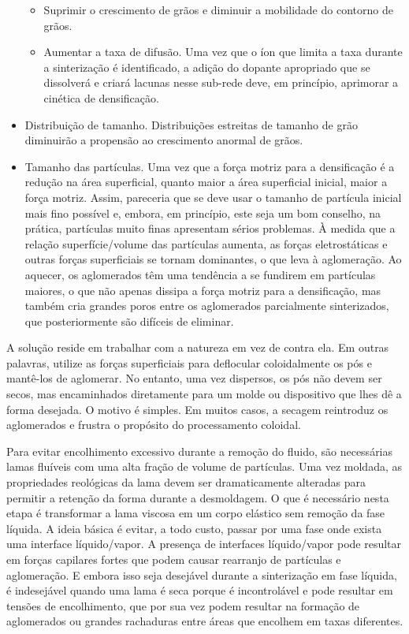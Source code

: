 \begin{itemize}
\begin{itemize}
        \item Suprimir o crescimento de grãos e diminuir a mobilidade do contorno de grãos.
        \item Aumentar a taxa de difusão. Uma vez que o íon que limita a taxa durante a sinterização é identificado, a adição do dopante apropriado que se dissolverá e criará lacunas nesse sub-rede deve, em princípio, aprimorar a cinética de densificação.
    \end{itemize}
    \item Distribuição de tamanho. Distribuições estreitas de tamanho de grão diminuirão a propensão ao crescimento anormal de grãos.
    \item Tamanho das partículas. Uma vez que a força motriz para a densificação é a redução na área superficial, quanto maior a área superficial inicial, maior a força motriz. Assim, pareceria que se deve usar o tamanho de partícula inicial mais fino possível e, embora, em princípio, este seja um bom conselho, na prática, partículas muito finas apresentam sérios problemas. À medida que a relação superfície/volume das partículas aumenta, as forças eletrostáticas e outras forças superficiais se tornam dominantes, o que leva à aglomeração. Ao aquecer, os aglomerados têm uma tendência a se fundirem em partículas maiores, o que não apenas dissipa a força motriz para a densificação, mas também cria grandes poros entre os aglomerados parcialmente sinterizados, que posteriormente são difíceis de eliminar.
\end{itemize}

A solução reside em trabalhar com a natureza em vez de contra ela. Em outras palavras, utilize as forças superficiais para deflocular coloidalmente os pós e mantê-los de aglomerar. No entanto, uma vez dispersos, os pós não devem ser secos, mas encaminhados diretamente para um molde ou dispositivo que lhes dê a forma desejada. O motivo é simples. Em muitos casos, a secagem reintroduz os aglomerados e frustra o propósito do processamento coloidal.

Para evitar encolhimento excessivo durante a remoção do fluido, são necessárias lamas fluíveis com uma alta fração de volume de partículas. Uma vez moldada, as propriedades reológicas da lama devem ser dramaticamente alteradas para permitir a retenção da forma durante a desmoldagem. O que é necessário nesta etapa é transformar a lama viscosa em um corpo elástico sem remoção da fase líquida. A ideia básica é evitar, a todo custo, passar por uma fase onde exista uma interface líquido/vapor. A presença de interfaces líquido/vapor pode resultar em forças capilares fortes que podem causar rearranjo de partículas e aglomeração. E embora isso seja desejável durante a sinterização em fase líquida, é indesejável quando uma lama é seca porque é incontrolável e pode resultar em tensões de encolhimento, que por sua vez podem resultar na formação de aglomerados ou grandes rachaduras entre áreas que encolhem em taxas diferentes.

